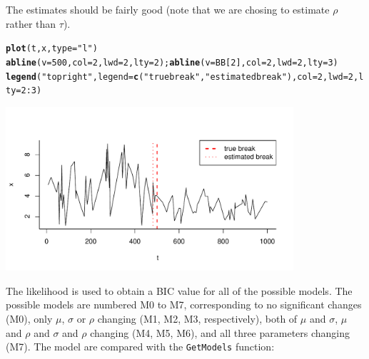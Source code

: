 \documentclass[10pt]{article}\usepackage[]{graphicx}\usepackage[]{color}
\makeatletter
\newcommand{\hlnum}[1]{\textcolor[rgb]{0.686,0.059,0.569}{#1}}%
\newcommand{\hlstr}[1]{\textcolor[rgb]{0.192,0.494,0.8}{#1}}%
\newcommand{\hlopt}[1]{\textcolor[rgb]{0,0,0}{#1}}%
\newcommand{\hlstd}[1]{\textcolor[rgb]{0.345,0.345,0.345}{#1}}%
\newcommand{\hlkwc}[1]{\textcolor[rgb]{0.333,0.667,0.333}{#1}}%
\newcommand{\hlkwd}[1]{\textcolor[rgb]{0.737,0.353,0.396}{\textbf{#1}}}%
\newenvironment{kframe}{%
 \def\at@end@of@kframe{}%
 \ifinner\ifhmode%
  \def\at@end@of@kframe{\end{minipage}}%
  \begin{minipage}{\columnwidth}%
 \fi\fi%
 \def\FrameCommand##1{\hskip\@totalleftmargin \hskip-\fboxsep
 \colorbox{shadecolor}{##1}\hskip-\fboxsep
     \hskip-\linewidth \hskip-\@totalleftmargin \hskip\columnwidth}%
 \MakeFramed {\advance\hsize-\width
   \@totalleftmargin\z@ \linewidth\hsize
   \@setminipage}}%
 {\par\unskip\endMakeFramed%
 \at@end@of@kframe}
\newenvironment{knitrout}{}{} %
\newcommand{\bc}{\begin{center}}
\newcommand{\ec}{\end{center}}
\makeatother
\begin{document}
The estimates should be fairly good (note that we are chosing to estimate $\rho$ rather than $\tau$).
\bc
\begin{knitrout}
\color{fgcolor}\begin{kframe}
\begin{alltt}
\hlkwd{plot}\hlstd{(t,x,} \hlkwc{type}\hlstd{=}\hlstr{"l"}\hlstd{)}
\hlkwd{abline}\hlstd{(}\hlkwc{v} \hlstd{=} \hlnum{500}\hlstd{,} \hlkwc{col}\hlstd{=}\hlnum{2}\hlstd{,} \hlkwc{lwd}\hlstd{=}\hlnum{2}\hlstd{,} \hlkwc{lty}\hlstd{=}\hlnum{2}\hlstd{);} \hlkwd{abline}\hlstd{(}\hlkwc{v} \hlstd{= BB[}\hlnum{2}\hlstd{],} \hlkwc{col}\hlstd{=}\hlnum{2}\hlstd{,} \hlkwc{lwd}\hlstd{=}\hlnum{2}\hlstd{,} \hlkwc{lty}\hlstd{=}\hlnum{3}\hlstd{)}
\hlkwd{legend}\hlstd{(}\hlstr{"topright"}\hlstd{,} \hlkwc{legend}\hlstd{=}\hlkwd{c}\hlstd{(}\hlstr{"true break"}\hlstd{,} \hlstr{"estimated break"}\hlstd{),} \hlkwc{col}\hlstd{=}\hlnum{2}\hlstd{,} \hlkwc{lwd}\hlstd{=}\hlnum{2}\hlstd{,} \hlkwc{lty}\hlstd{=}\hlnum{2}\hlopt{:}\hlnum{3}\hlstd{)}
\end{alltt}
\end{kframe}
\includegraphics[width=0.8\textwidth]{figure/OneBreak2} 

\end{knitrout}

\ec

The likelihood is used to obtain a BIC value for all of the possible models.  The possible models are numbered M0 to M7, corresponding to no significant changes (M0), only $\mu$, $\sigma$ or $\rho$ changing (M1, M2, M3, respectively), both of $\mu$ and $\sigma$, $\mu$ and $\rho$ and $\sigma$ and $\rho$ changing (M4, M5, M6), and all three parameters changing (M7).  The model are compared with the \texttt{GetModels} function:
\end{document}

